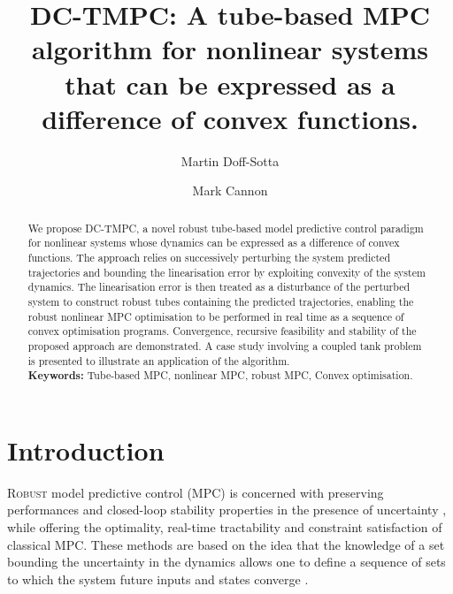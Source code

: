 \documentclass[letterpaper, 10 pt, conference]{ieeeconf}
\title{\LARGE \bf
DC-TMPC: A tube-based MPC algorithm for nonlinear systems that can be expressed as a difference of convex functions.
}
\author[$\star$]{Martin Doff-Sotta}%
\author[$\star$]{Mark Cannon}
\affil[$\star$]{Control Group, University of Oxford}
\begin{document}
\maketitle
\pagestyle{plain}

\begin{abstract}
We propose DC-TMPC, a novel robust tube-based model predictive control paradigm for nonlinear systems whose dynamics can be expressed as a difference of convex functions. The approach relies on successively perturbing the system predicted trajectories and bounding the linearisation error by exploiting convexity of the system dynamics. The linearisation error is then treated as a disturbance of the perturbed system to construct robust tubes containing the predicted trajectories, enabling the robust nonlinear MPC optimisation to be performed in  real time as a sequence of convex optimisation programs. Convergence, recursive feasibility and stability of the proposed approach are demonstrated. A case study involving a coupled tank problem is presented to illustrate an application of the algorithm. \\

\noindent\textbf{Keywords:}
Tube-based MPC, nonlinear MPC, robust MPC, Convex optimisation.
\end{abstract}

\section{Introduction}
\lettrine{R}{obust} model predictive control (MPC) is concerned with preserving performances and closed-loop stability properties in the presence of uncertainty \cite{kouvaritakis}, while offering the optimality, real-time tractability and constraint satisfaction of classical MPC. These methods are based on the idea that the knowledge of a set bounding the uncertainty in the dynamics allows one to define a sequence of sets to which the system future inputs and states converge \cite{kouvaritakis}.
\end{document}
